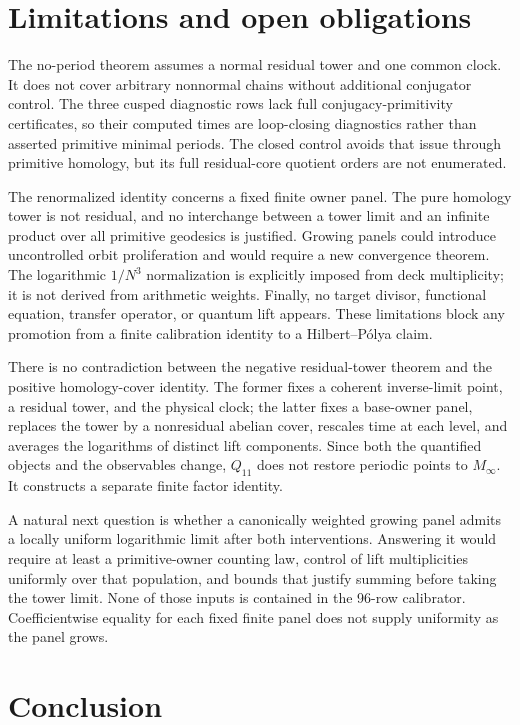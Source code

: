 \documentclass[11pt]{article}
\theoremstyle{definition}
\theoremstyle{remark}
\begin{document}
\section{Limitations and open obligations}

The no-period theorem assumes a normal residual tower and one common clock. It does not cover arbitrary nonnormal chains without additional conjugator control. The three cusped diagnostic rows lack full conjugacy-primitivity certificates, so their computed times are loop-closing diagnostics rather than asserted primitive minimal periods. The closed control avoids that issue through primitive homology, but its full residual-core quotient orders are not enumerated.

The renormalized identity concerns a fixed finite owner panel. The pure homology tower is not residual, and no interchange between a tower limit and an infinite product over all primitive geodesics is justified. Growing panels could introduce uncontrolled orbit proliferation and would require a new convergence theorem. The logarithmic $1/N^3$ normalization is explicitly imposed from deck multiplicity; it is not derived from arithmetic weights. Finally, no target divisor, functional equation, transfer operator, or quantum lift appears. These limitations block any promotion from a finite calibration identity to a Hilbert--Pólya claim.

There is no contradiction between the negative residual-tower theorem and the positive homology-cover identity. The former fixes a coherent inverse-limit point, a residual tower, and the physical clock; the latter fixes a base-owner panel, replaces the tower by a nonresidual abelian cover, rescales time at each level, and averages the logarithms of distinct lift components. Since both the quantified objects and the observables change, $Q_{11}$ does not restore periodic points to $M_\infty$. It constructs a separate finite factor identity.

A natural next question is whether a canonically weighted growing panel admits a locally uniform logarithmic limit after both interventions. Answering it would require at least a primitive-owner counting law, control of lift multiplicities uniformly over that population, and bounds that justify summing before taking the tower limit. None of those inputs is contained in the 96-row calibrator. Coefficientwise equality for each fixed finite panel does not supply uniformity as the panel grows.

\section{Conclusion}
\end{document}
